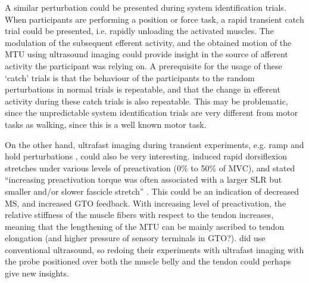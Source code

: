 A similar perturbation could be presented during system identification trials. When participants are performing a position or force task, a rapid transient catch trial could be presented, i.e. rapidly unloading the activated muscles. The modulation of the subsequent efferent activity, and the obtained motion of the MTU using ultrasound imaging  could provide insight in the source of afferent activity the participant was relying on. A prerequisite for the usage of these `catch' trials is that the behaviour of the participants to the random perturbations in normal trials is repeatable, and that the change in efferent activity during these catch trials is also repeatable. This may be problematic, since the unpredictable system identification trials are very different from motor tasks as walking, since this is a well known motor task. 

On the other hand, ultrafast imaging during transient experiments, e.g. ramp and hold perturbations \cite{schuurmans_monosynaptic_2009}, could also be very interesting. \citeauthor{cronin_triceps_2015} induced rapid dorsiflexion stretches under various levels of preactivation (0\% to 50\% of MVC), and stated ``increasing preactivation torque was often associated with a larger SLR but smaller and/or slower fascicle stretch'' \cite{cronin_triceps_2015}. This could be an indication of decreased MS, and increased GTO feedback. With increasing level of preactivation, the relative stiffness of the muscle fibers with respect to the tendon increases, meaning that the lengthening of the MTU can be mainly ascribed to tendon elongation (and higher pressure of sensory terminals in GTO?). \citet{cronin_triceps_2015} did use conventional ultrasound, so redoing their experiments with ultrafast imaging with the probe positioned over both the muscle belly and the tendon could perhaps give new insights. 



